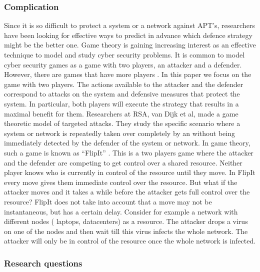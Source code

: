 \subsubsection{Complication}
Since it is so difficult to protect a system or a network against APT's, researchers have been looking for effective ways to predict in advance which defence strategy might be the better one. 
Game theory is gaining increasing interest as an effective technique to model and study cyber security problems. It is common to model cyber security games as a game with two players, an attacker and a defender. However, there are games that have more players \cite{fengstealthy}. In this paper we focus on the game with two players. The actions available to the attacker and the defender correspond to attacks on the system and defensive measures that protect the system. In particular, both players will execute the strategy that results in a maximal benefit for them.  Researchers at RSA, van Dijk et al,  made a game theoretic model of targeted attacks. They study the specific scenario where a system or network is repeatedly taken over completely by an without being immediately detected by the defender of the system or network. In game theory, such a game is known as ``FlipIt'' \cite{FlipIt}. This is a two players game where the attacker and the defender are competing to get control over a shared resource. Neither player knows who is currently in control of the resource until they move. In FlipIt every move gives them immediate control over the resource. But what if the attacker moves and it takes a while before the attacker gets full control over the resource? FlipIt does not take into account that a move may not be instantaneous, but has a certain delay. Consider for example a network with different nodes ( laptops, datacenters) as a resource. The attacker drops a virus on one of the nodes and then wait till this virus infects the whole network. The attacker will only be in control of the resource once the whole network is infected. \\

\subsubsection{Research questions}


